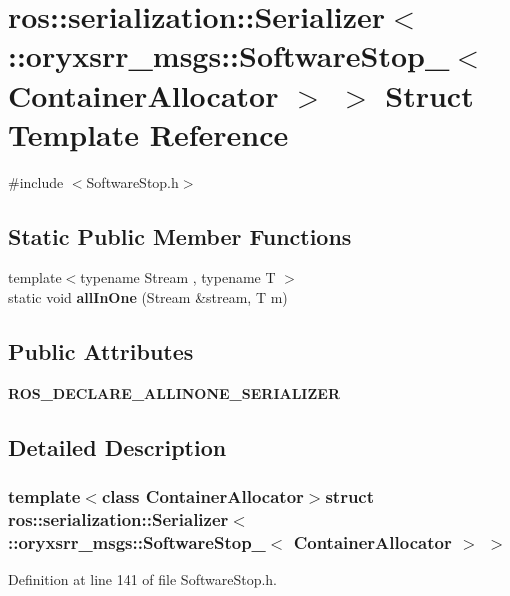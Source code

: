 \section{ros\-:\-:serialization\-:\-:\-Serializer$<$ \-:\-:oryxsrr\-\_\-msgs\-:\-:\-Software\-Stop\-\_\-$<$ \-Container\-Allocator $>$ $>$ \-Struct \-Template \-Reference}
\label{structros_1_1serialization_1_1Serializer_3_01_1_1oryxsrr__msgs_1_1SoftwareStop___3_01ContainerAllocator_01_4_01_4}


{\ttfamily \#include $<$\-Software\-Stop.\-h$>$}

\subsection*{\-Static \-Public \-Member \-Functions}
\begin{DoxyCompactItemize}
\item 
{\footnotesize template$<$typename Stream , typename T $>$ }\\static void {\bf all\-In\-One} (\-Stream \&stream, \-T m)
\end{DoxyCompactItemize}
\subsection*{\-Public \-Attributes}
\begin{DoxyCompactItemize}
\item 
{\bf \-R\-O\-S\-\_\-\-D\-E\-C\-L\-A\-R\-E\-\_\-\-A\-L\-L\-I\-N\-O\-N\-E\-\_\-\-S\-E\-R\-I\-A\-L\-I\-Z\-E\-R}
\end{DoxyCompactItemize}


\subsection{\-Detailed \-Description}
\subsubsection*{template$<$class Container\-Allocator$>$struct ros\-::serialization\-::\-Serializer$<$ \-::oryxsrr\-\_\-msgs\-::\-Software\-Stop\-\_\-$<$ Container\-Allocator $>$ $>$}



\-Definition at line 141 of file \-Software\-Stop.\-h.



